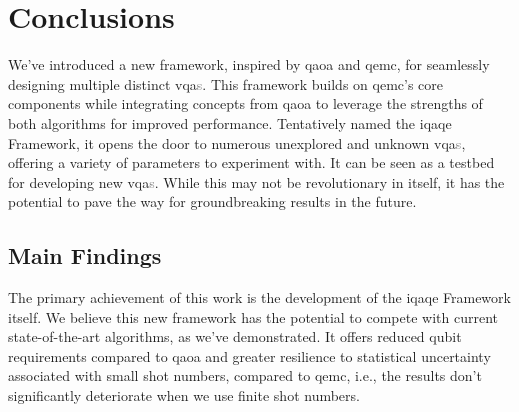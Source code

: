
\chapter{Conclusions}
\label{chapter:conclusions}


We've introduced a new framework, inspired by \acrshort{qaoa} and \acrshort{qemc}, for seamlessly designing multiple distinct \acrshort{vqa}\textcolor{gray}{s}. This framework builds on \acrshort{qemc}'s core components while integrating concepts from \acrshort{qaoa} to leverage the strengths of both algorithms for improved performance. Tentatively named the \acrshort{iqaqe} Framework, it opens the door to numerous unexplored and unknown \acrshort{vqa}\textcolor{gray}{s}, offering a variety of parameters to experiment with. It can be seen as a testbed for developing new \acrshort{vqa}\textcolor{gray}{s}. While this may not be revolutionary in itself, it has the potential to pave the way for groundbreaking results in the future.


\section{Main Findings}
\label{section:findings}

The primary achievement of this work is the development of the \acrshort{iqaqe} Framework itself. We believe this new framework has the potential to compete with current state-of-the-art algorithms, as we've demonstrated. It offers reduced qubit requirements compared to \acrshort{qaoa} and greater resilience to statistical uncertainty associated with small shot numbers, compared to \acrshort{qemc}, i.e., the results don't significantly deteriorate when we use finite shot numbers.

